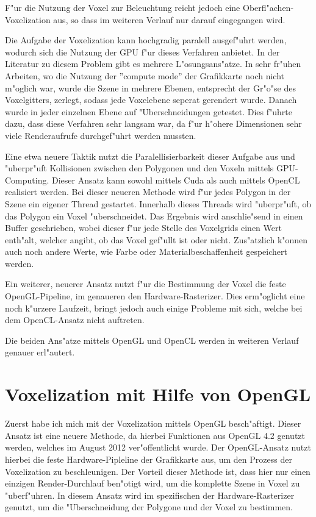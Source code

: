 \documentclass[a4paper, 12pt]{scrartcl}
\begin{document}
F"ur die Nutzung der Voxel zur Beleuchtung reicht jedoch eine Oberfl"achen-Voxelization aus, so dass im weiteren Verlauf nur darauf eingegangen wird.

Die Aufgabe der Voxelization kann hochgradig paralell ausgef"uhrt werden, wodurch sich die Nutzung der GPU f"ur dieses Verfahren anbietet. In der Literatur zu diesem Problem gibt es mehrere L"osungsans"atze. 
In sehr fr"uhen Arbeiten, wo die Nutzung der ''compute mode'' der Grafikkarte noch nicht m"oglich war, wurde die Szene in mehrere Ebenen, entsprecht der Gr"o"se des Voxelgitters, zerlegt, sodass jede Voxelebene seperat gerendert wurde. Danach wurde in jeder einzelnen Ebene auf "Uberschneidungen getestet. Dies f"uhrte dazu, dass diese Verfahren sehr langsam war, da f"ur h"ohere Dimensionen sehr viele Renderaufrufe durchgef"uhrt werden mussten.

Eine etwa neuere Taktik nutzt die Paralellisierbarkeit dieser Aufgabe aus und "uberpr"uft Kollisionen zwischen den Polygonen und den Voxeln mittels GPU-Computing. Dieser Ansatz kann sowohl mittels Cuda als auch mittels OpenCL realisiert werden.
Bei dieser neueren Methode wird f"ur jedes Polygon in der Szene ein eigener Thread gestartet.
Innerhalb dieses Threads wird "uberpr"uft, ob das Polygon ein Voxel "uberschneidet. Das Ergebnis wird anschlie"send in einen Buffer geschrieben, wobei dieser f"ur jede Stelle des Voxelgrids einen Wert enth"alt, welcher angibt, ob das Voxel gef"ullt ist oder nicht. 
Zus"atzlich k"onnen auch noch andere Werte, wie Farbe oder Materialbeschaffenheit gespeichert werden.

Ein weiterer, neuerer Ansatz nutzt f"ur die Bestimmung der Voxel die feste OpenGL-Pipeline, im genaueren den Hardware-Rasterizer. Dies erm"oglicht eine noch k"urzere Laufzeit, bringt jedoch auch einige Probleme mit sich, welche bei dem OpenCL-Ansatz nicht auftreten.

Die beiden Ans"atze mittels OpenGL und OpenCL werden in weiteren Verlauf genauer erl"autert.

\newpage

\section{Voxelization mit Hilfe von OpenGL}
Zuerst habe ich mich mit der Voxelization mittels OpenGL besch"aftigt. Dieser Ansatz ist eine neuere Methode, da hierbei Funktionen aus OpenGL 4.2 genutzt werden, welches im August 2012 ver"offentlicht wurde.
Der OpenGL-Ansatz nutzt hierbei die feste Hardware-Pipleline der Grafikkarte aus, um den Prozess der Voxelization zu beschleunigen. 
Der Vorteil dieser Methode ist, dass hier nur einen einzigen Render-Durchlauf ben"otigt wird, um die komplette Szene in Voxel zu "uberf"uhren.
In diesem Ansatz wird im spezifischen der Hardware-Rasterizer genutzt, um die "Uberschneidung der Polygone und der Voxel zu bestimmen. 
\end{document}
